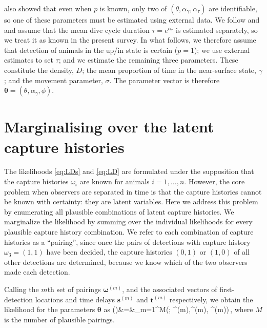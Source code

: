 \documentclass[useAMS, usenatbib, referee]{biom}\usepackage[]{graphicx}\usepackage[]{color}
\begin{document}
\cite{Stevenson+al:18} also showed that even when $p$ is known, only two of $(\theta,\alpha_\gamma,\alpha_\tau)$ are identifiable, so one of these parameters must be estimated using external data. We follow \cite{Stevenson+al:18} and \cite{Hiby+Lovell:98} and assume that the mean dive cycle duration $\tau=e^{\alpha_\tau}$ is estimated separately, so we treat it as known in the present survey. In what follows, we therefore assume that detection of animals in the up/in state is certain ($p=1$); we use external estimates to set $\tau$; and we estimate the remaining three parameters. These constitute the density, $D$; the mean proportion of time in the near-surface state, $\gamma$; and the movement parameter, $\sigma$. The parameter vector is therefore $\bm{\theta}=(\theta,\alpha_\gamma, \phi)$.



\section{Marginalising over the latent capture histories}

The likelihoods \eqref{eq:LDs} and \eqref{eq:LD} are formulated under the supposition that the capture histories $\omega_i$ are known for animals $i=1, \ldots, n$. However, the core problem when observers are separated in time is that the capture histories cannot be known with certainty: they are latent variables. Here we address this problem by enumerating all plausible combinations of latent capture histories. We marginalize the likelihood by summing over the individual likelihoods for every plausible capture history combination. We refer to each combination of capture histories as a ``pairing'', since once the pairs of detections with capture history $\omega_3=(1,1)$ have been decided, the capture histories $(0, 1)$ or $(1, 0)$ of all other detections are determined, because we know which of the two observers made each detection.

Calling the $m$th set of pairings $\bm{\omega}^{(m)}$, and the associated vectors of first-detection locations and time delays  $\bm{s}^{(m)}$ and $\bm{t}^{(m)}$ respectively, we obtain the likelihood for the parameters $\bm{\theta}$ as
\be
{}(\bm{\theta})&=&\sum_{m=1}^M\left(\bm{\theta}; ^{(m)},\bm{\omega}^{(m)}, ^{(m)}\right)\,,
\ee
\noindent
where $M$ is the number of plausible pairings.
\end{document}
